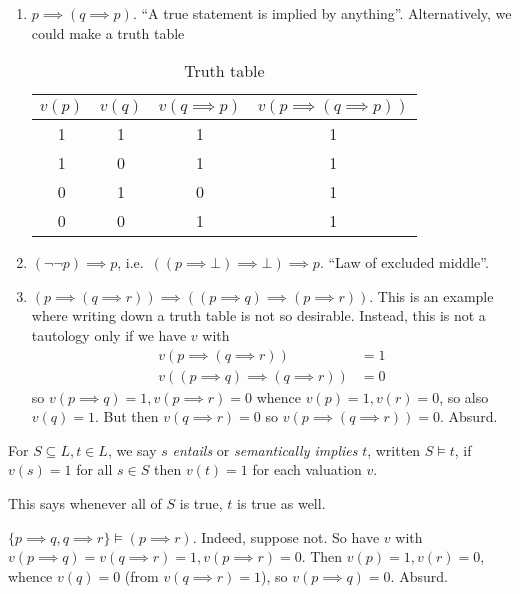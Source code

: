 \documentclass[a4paper]{article}
\begin{document}
\begin{eg}\leavevmode
  \begin{enumerate}
  \item \(p \implies (q \implies p)\). ``A true statement is implied by anything''. Alternatively, we could make a truth table
    \begin{table}[h]
      \centering
      \begin{tabular}{c|c|c|c}
        \(v(p)\) & \(v(q)\) & \(v(q \implies p)\) & \(v(p \implies (q \implies p))\) \\\hline
        1 & 1 & 1 & 1 \\
        1 & 0 & 1 & 1 \\
        0 & 1 & 0 & 1 \\
        0 & 0 & 1 & 1
      \end{tabular}
      \caption{Truth table}
    \end{table}
  \item \((\neg \neg p) \implies p\), i.e.\ \(((p \implies \bot) \implies \bot) \implies p\). ``Law of excluded middle''.
  \item \((p \implies (q \implies r)) \implies ((p \implies q) \implies (p \implies r))\). This is an example where writing down a truth table is not so desirable. Instead, this is not a tautology only if we have \(v\) with
    \begin{align*}
      v(p \implies (q\implies r)) &= 1 \\
      v((p \implies q) \implies (q \implies r)) &= 0
    \end{align*}
    so \(v(p \implies q) = 1, v(p \implies r) = 0\) whence \(v(p) = 1, v(r) = 0\), so also \(v(q) = 1\). But then \(v(q \implies r) = 0\) so \(v(p \implies (q \implies r)) = 0\). Absurd.
  \end{enumerate}
\end{eg}

\begin{definition}
  For \(S \subseteq L, t \in L\), we say \(s\) \emph{entails} or \emph{semantically implies} \(t\), written \(S \models t\), if \(v(s) = 1\) for all \(s \in S\) then \(v(t) = 1\) for each valuation \(v\).
\end{definition}

This says whenever all of \(S\) is true, \(t\) is true as well.

\begin{eg}
  \(\{p \implies q, q \implies r\} \models (p \implies r)\). Indeed, suppose not. So have \(v\) with \(v(p \implies q) = v(q \implies r) = 1, v(p \implies r) = 0\). Then \(v(p) = 1, v(r) = 0\), whence \(v(q) = 0\) (from \(v(q \implies r) = 1\)), so \(v(p \implies q) = 0\). Absurd.
\end{eg}
\end{document}

